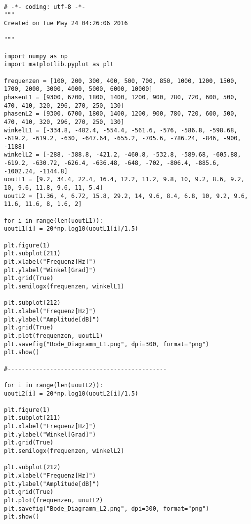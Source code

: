 \documentclass[12pt, oneside, a4paper, \docLanguage]{report}
\begin{document}
\begin{lstlisting}[style=PYTHON, frame=single, caption=Bode-Diagramm beider Lautsprecher, captionpos=b, label=lst:Bode]

# -*- coding: utf-8 -*-
"""
Created on Tue May 24 04:26:06 2016

"""

import numpy as np
import matplotlib.pyplot as plt

frequenzen = [100, 200, 300, 400, 500, 700, 850, 1000, 1200, 1500, 1700, 2000, 3000, 4000, 5000, 6000, 10000]
phasenL1 = [9300, 6700, 1800, 1400, 1200, 900, 780, 720, 600, 500, 470, 410, 320, 296, 270, 250, 130]
phasenL2 = [9300, 6700, 1800, 1400, 1200, 900, 780, 720, 600, 500, 470, 410, 320, 296, 270, 250, 130]
winkelL1 = [-334.8, -482.4, -554.4, -561.6, -576, -586.8, -598.68, -619.2, -619.2, -630, -647.64, -655.2, -705.6, -786.24, -846, -900, -1188]
winkelL2 = [-288, -388.8, -421.2, -460.8, -532.8, -589.68, -605.88, -619.2, -630.72, -626.4, -636.48, -648, -702, -806.4, -885.6, -1002.24, -1144.8]
uoutL1 = [9.2, 34.4, 22.4, 16.4, 12.2, 11.2, 9.8, 10, 9.2, 8.6, 9.2, 10, 9.6, 11.8, 9.6, 11, 5.4]
uoutL2 = [1.36, 4, 6.72, 15.8, 29.2, 14, 9.6, 8.4, 6.8, 10, 9.2, 9.6, 11.6, 11.6, 8, 1.6, 2]

for i in range(len(uoutL1)):
uoutL1[i] = 20*np.log10(uoutL1[i]/1.5)

plt.figure(1)
plt.subplot(211)
plt.xlabel("Frequenz[Hz]")
plt.ylabel("Winkel[Grad]")
plt.grid(True)
plt.semilogx(frequenzen, winkelL1)

plt.subplot(212)
plt.xlabel("Frequenz[Hz]")
plt.ylabel("Amplitude[dB]")
plt.grid(True)
plt.plot(frequenzen, uoutL1)
plt.savefig("Bode_Diagramm_L1.png", dpi=300, format="png")
plt.show()

#---------------------------------------------

for i in range(len(uoutL2)):
uoutL2[i] = 20*np.log10(uoutL2[i]/1.5)

plt.figure(1)
plt.subplot(211)
plt.xlabel("Frequenz[Hz]")
plt.ylabel("Winkel[Grad]")
plt.grid(True)
plt.semilogx(frequenzen, winkelL2)

plt.subplot(212)
plt.xlabel("Frequenz[Hz]")
plt.ylabel("Amplitude[dB]")
plt.grid(True)
plt.plot(frequenzen, uoutL2)
plt.savefig("Bode_Diagramm_L2.png", dpi=300, format="png")
plt.show()


\end{lstlisting}


%
%

\end{document}
